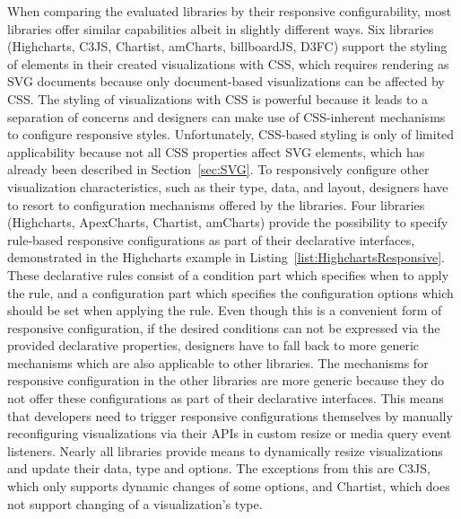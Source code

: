 When comparing the evaluated libraries by their responsive configurability, most libraries offer similar capabilities albeit in slightly different ways.
Six libraries (Highcharts, C3JS, Chartist, amCharts, billboardJS, D3FC) support the styling of elements in their created visualizations with CSS, which requires rendering as SVG documents because only document-based visualizations can be affected by CSS.
The styling of visualizations with CSS is powerful because it leads to a separation of concerns and designers can make use of CSS-inherent mechanisms to configure responsive styles.
Unfortunately, CSS-based styling is only of limited applicability because not all CSS properties affect SVG elements, which has already been described in Section~\ref{sec:SVG}.
To responsively configure other visualization characteristics, such as their type, data, and layout, designers have to resort to configuration mechanisms offered by the libraries. 
Four libraries (Highcharts, ApexCharts, Chartist, amCharts) provide the possibility to specify rule-based responsive configurations as part of their declarative interfaces, demonstrated in the Highcharts example in Listing~\ref{list:HighchartsResponsive}.
These declarative rules consist of a condition part which specifies when to apply the rule, and a configuration part which specifies the configuration options which should be set when applying the rule.
Even though this is a convenient form of responsive configuration, if the desired conditions can not be expressed via the provided declarative properties, designers have to fall back to more generic mechanisms which are also applicable to other libraries. 
The mechanisms for responsive configuration in the other libraries are more generic because they do not offer these configurations as part of their declarative interfaces. 
This means that developers need to trigger responsive configurations themselves by manually reconfiguring visualizations via their APIs in custom resize or media query event listeners.
Nearly all libraries provide means to dynamically resize visualizations and update their data, type and options.
The exceptions from this are C3JS, which only supports dynamic changes of some options, and Chartist, which does not support changing of a visualization's type.

\begin{samepage}
 
    This example demonstrates how responsive rules can be declared to configure various aspects of a visualization in relation to the size of the viewport.
  },
]{listings/highcharts-responsive.js}
\end{samepage}
